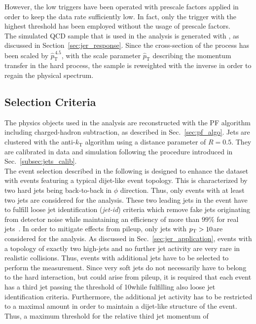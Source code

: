 However, the low \ptave triggers have been operated with prescale factors applied in order to keep the data rate sufficiently low. In fact, only the trigger with the highest \ptave threshold has been employed without the usage of prescale factors. \\
The simulated QCD sample that is used in the analysis is generated with \pythia, as discussed in Section~\ref{sec:jer_response}. Since the cross-section of the process has been scaled by $\hat{p}_\mathrm{T}^{\,4.5}$, with the scale parameter $\hat{p}_\mathrm{T}$ describing the momentum transfer in the hard process, the sample is reweighted with the inverse in order to regain the physical spectrum.  

\subsection{Selection Criteria}
\label{subsec:jer_sel_cuts}
The physics objects used in the analysis are reconstructed with the PF algorithm including charged-hadron subtraction, as described in Sec.~\ref{sec:pf_algo}. Jets are clustered with the anti-$k_\mathrm{T}$ algorithm using a distance parameter of $R=0.5$. They are calibrated in data and simulation following the procedure introduced in Sec.~\ref{subsec:jets_calib}.  \\
The event selection described in the following is designed to enhance the dataset with events featuring a typical dijet-like event topology. This is characterized by two hard jets being back-to-back in $\phi$ direction. Thus, only events with at least two jets are considered for the analysis. These two leading jets in the event have to fulfill loose jet identification (\textit{jet-id}) criteria which remove fake jets originating from detector noise while maintaining an efficiency of more than $99\%$ for real jets~\cite{CMS-PAS-JME-09-008, CMS-PAS-JME-10-003}. In order to mitigate effects from pileup, only jets with $p_{\text{T}} > 10$\gev are considered for the analysis. As discussed in Sec.~\ref{sec:jer_application}, events with a topology of exactly two high-\pt jets and no further jet activity are very rare in realistic collisions. Thus, events with additional jets have to be selected to perform the measurement. Since very soft jets do not necessarily have to belong to the hard interaction, but could arise from pileup, it is required that each event has a third jet passing the \pt threshold of 10\gev while fulfilling also loose jet identification criteria. Furthermore, the additional jet activity has to be restricted to a maximal amount in order to maintain a dijet-like structure of the event. Thus, a maximum threshold for the relative third jet momentum of 
